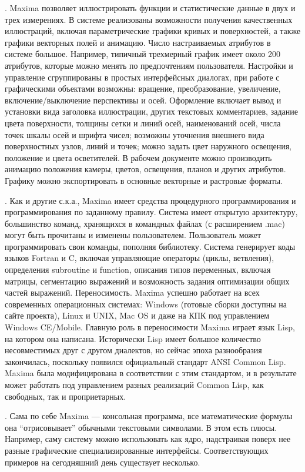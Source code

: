 . Maxima позволяет иллюстрировать функции и статистические данные в двух и трех измерениях. В системе реализованы возможности получения качественных иллюстраций, включая параметрические графики кривых и поверхностей, а также графики векторных полей и анимацию. Число настраиваемых атрибутов в системе большое. Например, типичный трехмерный график имеет около 200 атрибутов, которые можно менять по предпочтениям пользователя. Настройки и управление сгруппированы в простых интерфейсных диалогах, при работе с графическими объектами возможны: вращение, преобразование, увеличение, включение/выключение перспективы и осей. Оформление включает вывод и установки вида заголовка иллюстрации, других текстовых комментариев, задание цвета поверхности, толщины сетки и линий осей, наименований осей, числа точек шкалы осей и шрифта чисел; возможны уточнения внешнего вида поверхностных узлов, линий и точек; можно задать цвет наружного освещения, положение и цвета осветителей. В рабочем документе можно производить анимацию положения камеры, цветов, освещения, планов и других атрибутов. Графику можно экспортировать в основные векторные и растровые форматы.

. Как и другие с.к.а., Maxima имеет средства процедурного программирования и программирования по заданному правилу. Система имеет открытую архитектуру, большинство команд, хранящихся в командных файлах (с расширением .mac) могут быть прочитаны и изменены пользователем. Пользователь может программировать свои команды, пополняя библиотеку. Система генерирует коды языков Fortran и C, включая управляющие операторы (циклы, ветвления), определения subroutine и function, описания типов переменных, включая матрицы, сегментацию выражений и возможность задания оптимизации общих частей выражений.
Переносимость. Maxima успешно работает на всех современных операционных системах: Windows (готовые сборки доступны на сайте проекта), Linux и UNIX, Mac OS и даже на КПК под управлением Windows CE/Mobile. Главную роль в переносимости Maxima играет язык Lisp, на котором она написана. Исторически Lisp имеет большое количество несовместимых друг с другом диалектов, но сейчас эпоха разнообразия закончилась, поскольку появился официальный стандарт ANSI Common Lisp. Maxima была модифицирована в соответствии с этим стандартом, и в результате может работать под управлением разных реализаций Common Lisp, как свободных, так и проприетарных.

. Сама по себе Maxima --- консольная программа, все математические формулы она “отрисовывает” обычными текстовыми символами. В этом есть плюсы. Например, саму систему можно использовать как ядро, надстраивая поверх нее разные графические специализированные интерфейсы. Соответствующих примеров на сегодняшний день существует несколько.

